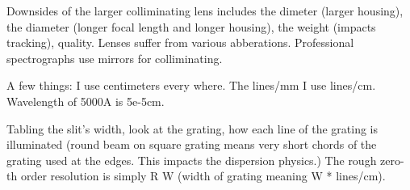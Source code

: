 Downsides of the larger colliminating lens includes the dimeter
(larger housing), the diameter (longer focal length and longer
housing), the weight (impacts tracking), quality. Lenses suffer from
various abberations. Professional spectrographs use mirrors for
colliminating.

A few things: I use centimeters every where. The lines/mm
I use lines/cm. Wavelength of 5000A is 5e-5cm. 

Tabling the slit's width, look at the grating, how each
line of the grating is illuminated (round beam on square
grating means very short chords of the grating used
at the edges. This impacts the dispersion physics.)
The rough zero-th order resolution is simply R \equiv
W (width of grating meaning W * lines/cm).


